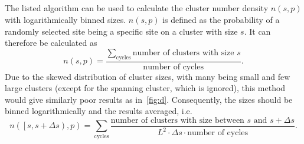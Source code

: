 \documentclass[11pt,british,a4paper]{report}
\begin{document}
%
\subsection{}
The listed algorithm can be used to calculate the cluster number density \(n(s,p)\) with logarithmically binned sizes. \(n(s,p)\) is defined as the probability of a randomly selected site being a specific site on a cluster with size \(s\). It can therefore be calculated as
\begin{equation}
    n(s,p) = \frac{\displaystyle\sum_{\text{cycles}}\text{number of clusters with size } s}{\text{number of cycles}}.
\end{equation}
Due to the skewed distribution of cluster sizes, with many being small and few large clusters (except for the spanning cluster, which is ignored), this method would give similarly poor results as in~\vref{fig:d}. Consequently, the sizes should be binned logarithmically and the results averaged, i.e.
\begin{equation}
    n\left(\left[s,s+\Delta s\right),p\right) = \displaystyle\sum_{\text{cycles}}\frac{\text{number of clusters with size between } s \text{ and } s+\Delta s}{L^2 \cdot \Delta s \cdot \text{number of cycles}}.
\end{equation}



%
\end{document}
